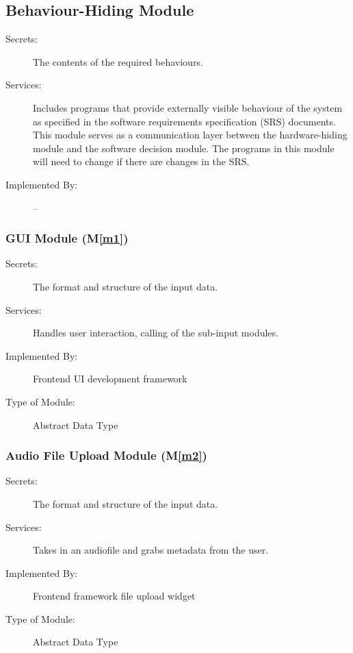 \documentclass[12pt, titlepage]{article}
\newcommand{\mref}[1]{M\ref{#1}}
\begin{document}
\subsection{Behaviour-Hiding Module}

\begin{description}
\item[Secrets:]The contents of the required behaviours.
\item[Services:]Includes programs that provide externally visible behaviour of
  the system as specified in the software requirements specification (SRS)
  documents. This module serves as a communication layer between the
  hardware-hiding module and the software decision module. The programs in this
  module will need to change if there are changes in the SRS.
\item[Implemented By:] --
\end{description}

\subsubsection{GUI Module (\mref{m1})}

\begin{description}
\item[Secrets:] The format and structure of the input data.
\item[Services:] Handles user interaction, calling of the sub-input modules. 
\item[Implemented By:] Frontend UI development framework
\item[Type of Module:] Abstract Data Type
\end{description}

\subsubsection{Audio File Upload Module (\mref{m2})}

\begin{description}
\item[Secrets:] The format and structure of the input data.
\item[Services:] Takes in an audiofile and grabs metadata from the user. 
\item[Implemented By:] Frontend framework file upload widget
\item[Type of Module:] Abstract Data Type
\end{description}
\end{document}
